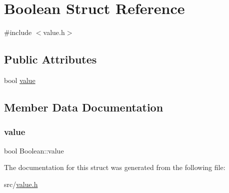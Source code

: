 \hypertarget{struct_boolean}{}\section{Boolean Struct Reference}
\label{struct_boolean}


{\ttfamily \#include $<$value.\+h$>$}

\subsection*{Public Attributes}
\begin{DoxyCompactItemize}
\item 
bool \hyperlink{struct_boolean_a8e44c7f95d984f2dc8c6974f607b2b36}{value}
\end{DoxyCompactItemize}


\subsection{Member Data Documentation}
\mbox{\label{struct_boolean_a8e44c7f95d984f2dc8c6974f607b2b36}} 
\subsubsection{\texorpdfstring{value}{value}}
{\footnotesize\ttfamily bool Boolean\+::value}



The documentation for this struct was generated from the following file\+:\begin{DoxyCompactItemize}
\item 
src/\hyperlink{value_8h}{value.\+h}\end{DoxyCompactItemize}
